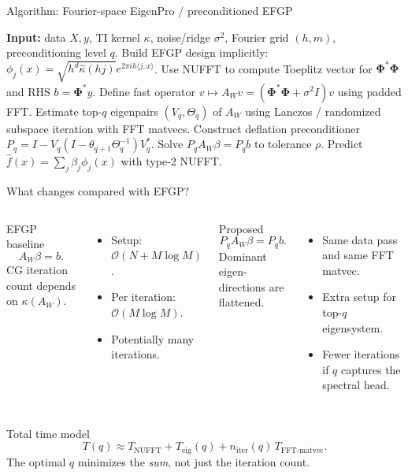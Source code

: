 \documentclass[aspectratio=169,11pt]{ctexbeamer}
\newcommand{\PhiMat}{\bm{\Phi}}
\newcommand{\OO}{\mathcal{O}}
\begin{document}
\begin{frame}{Algorithm: Fourier-space EigenPro / preconditioned EFGP}
\small
\begin{algorithmic}[1]
\State \textbf{Input:} data $X,y$, TI kernel $\kappa$, noise/ridge $\sigma^2$, Fourier grid $(h,m)$, preconditioning level $q$.
\State Build EFGP design implicitly: $\phi_j(x)=\sqrt{h^d\widehat\kappa(hj)}e^{2\pi ih\langle j,x\rangle}$.
\State Use NUFFT to compute Toeplitz vector for $\PhiMat^*\PhiMat$ and RHS $b=\PhiMat^*y$.
\State Define fast operator $v\mapsto A_Wv=(\PhiMat^*\PhiMat+\sigma^2I)v$ using padded FFT.
\State Estimate top-$q$ eigenpairs $(V_q,\Theta_q)$ of $A_W$ using Lanczos / randomized subspace iteration with FFT matvecs.
\State Construct deflation preconditioner $P_q=I-V_q(I-\theta_{q+1}\Theta_q^{-1})V_q^*$.
\State Solve $P_qA_W\beta=P_qb$ to tolerance $\rho$.
\State Predict $\widehat f(x)=\sum_j\beta_j\phi_j(x)$ with type-2 NUFFT.
\end{algorithmic}
\vspace{0.15cm}
\begin{center}
\end{center}
\end{frame}

\begin{frame}{What changes compared with EFGP?}
\begin{columns}[T,onlytextwidth]
\begin{block}{EFGP baseline}
\[
A_W\beta=b.
\]
CG iteration count depends on $\kappa(A_W)$.
\end{block}
\begin{itemize}
  \item Setup: $\OO(N+M\log M)$.
  \item Per iteration: $\OO(M\log M)$.
  \item Potentially many iterations.
\end{itemize}
\begin{block}{Proposed}
\[
P_qA_W\beta=P_qb.
\]
Dominant eigen-directions are flattened.
\end{block}
\begin{itemize}
  \item Same data pass and same FFT matvec.
  \item Extra setup for top-$q$ eigensystem.
  \item Fewer iterations if $q$ captures the spectral head.
\end{itemize}
\end{columns}
\vspace{0.25cm}
\begin{block}{Total time model}
\[
T(q) \approx T_{\text{NUFFT}} + T_{\text{eig}}(q) + n_{\text{iter}}(q)\,T_{\text{FFT-matvec}}.
\]
The optimal $q$ minimizes the \emph{sum}, not just the iteration count.
\end{block}
\end{frame}
\end{document}
